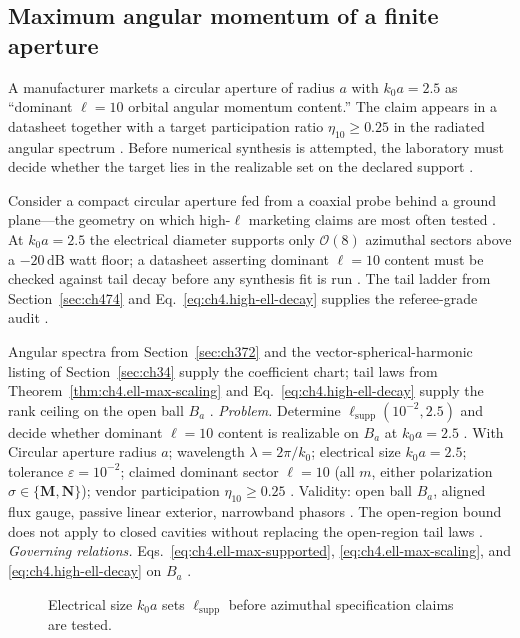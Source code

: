 \subsection{Maximum angular momentum of a finite aperture}
\label{sec:ch4101}
A manufacturer markets a circular aperture of radius $a$ with $k_{0}a=2.5$ as ``dominant $\ell=10$ orbital angular momentum content.'' The claim appears in a datasheet together with a target participation ratio $\eta_{10}\ge0.25$ in the radiated angular spectrum \cite{harrington2001}. Before numerical synthesis is attempted, the laboratory must decide whether the target lies in the realizable set on the declared support \cite{devaney2004}.
\begin{physicalvignette}
Consider a compact circular aperture fed from a coaxial probe behind a ground plane---the geometry on which high-$\ell$ marketing claims are most often tested \cite{collin2001}. At $k_{0}a=2.5$ the electrical diameter supports only $\mathcal{O}(8)$ azimuthal sectors above a $-20\,\mathrm{dB}$ watt floor; a datasheet asserting dominant $\ell=10$ content must be checked against tail decay before any synthesis fit is run \cite{stratton1941}. The tail ladder from Section~\ref{sec:ch474} and Eq.~\eqref{eq:ch4.high-ell-decay} supplies the referee-grade audit \cite{hansen1988}.
\end{physicalvignette}
Angular spectra from Section~\ref{sec:ch372} and the vector-spherical-harmonic listing of Section~\ref{sec:ch34} supply the coefficient chart; tail laws from Theorem~\ref{thm:ch4.ell-max-scaling} and Eq.~\eqref{eq:ch4.high-ell-decay} supply the rank ceiling on the open ball $B_{a}$ \cite{hansen1988}.
\emph{Problem.} Determine $\ell_{\mathrm{supp}}(10^{-2},2.5)$ and decide whether dominant $\ell=10$ content is realizable on $B_{a}$ at $k_{0}a=2.5$ .
With Circular aperture radius $a$; wavelength $\lambda=2\pi/k_{0}$; electrical size $k_{0}a=2.5$; tolerance $\varepsilon=10^{-2}$; claimed dominant sector $\ell=10$ (all $m$, either polarization $\sigma\in\{\mathbf{M},\mathbf{N}\}$); vendor participation $\eta_{10}\ge0.25$ . Validity: open ball $B_{a}$, aligned flux gauge, passive linear exterior, narrowband phasors . The open-region bound does not apply to closed cavities without replacing the open-region tail laws .
\emph{Governing relations.} Eqs.~\eqref{eq:ch4.ell-max-supported}, \eqref{eq:ch4.ell-max-scaling}, and \eqref{eq:ch4.high-ell-decay} on $B_{a}$ .
\begin{figure}[t]
\centering
{}
\caption{Electrical size $k_{0}a$ sets $\ell_{\mathrm{supp}}$ before azimuthal specification claims are tested.}
\label{fig:ch4.ex-ell-max-aperture}
\end{figure}
